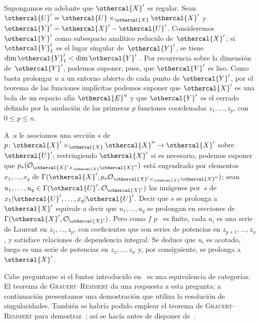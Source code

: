 Supongamos
en adelante que $\othercal{X}'$ es regular. Sean
$\othercal{U}'=\othercal{U}\times_{\othercal{X}}\othercal{X}'$ y
$\othercal{Y}'=\othercal{X}'-\othercal{U}'$. Consideremos
$\othercal{Y}'$ como subespacio analítico reducido de~$\othercal{X}'$;
si $\othercal{Y}'_1$ es el lugar singular de~$\othercal{Y}'$, se tiene
$\dim\othercal{Y}'_1<\dim\othercal{Y}'$
\cite[~D\ptbl Th]{XII.4}. Por recurrencia sobre la dimensión
de~$\othercal{Y}'$, podemos suponer, pues, que $\othercal{Y}'$ es liso.
Como basta prolongar $u$ a un entorno abierto de cada punto de
$\othercal{Y}'$, por el teorema de las funciones implícitas podemos
suponer que $\othercal{X}'$ es una bola de un espacio afín
$\othercal{E}^n$ y que $\othercal{Y}'$ es el cerrado definido por la
anulación de las primeras $p$ funciones coordenadas
$z_1,\dots,z_p$, con $0\leq p\leq n$.

A~$u$ le asociamos una sección $s$ de
$p\colon\othercal{X}'\times_{\othercal{X}}\othercal{X}''\to\othercal{X}'$
sobre~$\othercal{U}'$; restringiendo $\othercal{X}'$ si es necesario,
podemos suponer que
$p_*(\cal{O}_{\othercal{X}'\times_{\othercal{X}}\othercal{X}''})$ está
engendrado por elementos $x_1,\dots,x_q$ de
$\Gamma(\othercal{X}',p_*\cal{O}_{\othercal{X}'\times_{\othercal{X}}\othercal{X}''})$;
sean $u_1,\dots,u_q\in\Gamma(\othercal{U}',\cal{O}_{\othercal{X}'})$ las
imágenes por~$s$ de~${x_1}|\othercal{U}',\dots,{x_q}|\othercal{U}'$.
Decir que $s$ se prolonga a~$\othercal{X}'$ equivale a decir que
$u_1,\dots,u_q$ se prolongan en secciones de
$\Gamma(\othercal{X}',\cal{O}_{\othercal{X}'})$. Pero como
{$f$}
{$p$}%
~es finito, cada $u_i$ es una serie de Laurent en
$z_1,\dots,z_p$, con coeficientes que son series de potencias en
$z_{p{+}1},\dots,z_n$, y satisface relaciones de dependencia integral.
Se deduce que $u_i$ es acotado, luego es una serie de potencias en
$z_1,\dots,z_n$ y, por consiguiente, se prolonga a~$\othercal{X}'$.

Cabe preguntarse si el funtor introducido en~ es una
equivalencia de categorías. El teorema de
\textsc{Grauert}--\textsc{Remmert} \cite{XII.6} da una respuesta a esta
pregunta; a continuación presentamos una demostración que utiliza la
resolución de singularidades. También se habría podido emplear el teorema
de \textsc{Grauert}--\textsc{Remmert} para demostrar~; así
se hacía antes de disponer de~\cite{XII.8}.


